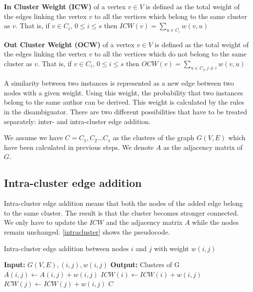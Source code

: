 \begin{mydef}
\textbf{In Cluster Weight (ICW)} of a vertex $v \in V$ is defined as the total weight of the edges linking the vertex $v$ to all the vertices which belong to the same cluster as $v$. That is, if $v \in C_i$, $0 \leq i \leq s$ then $ICW(v) = \sum_{u \in C_i}{w(v,u)}$
\end{mydef}

\begin{mydef}
\textbf{Out Cluster Weight (OCW)} of a vertex $v \in V$ is defined as the total weight of the edges linking the vertex $v$ to all the vertices which do not belong to the same cluster as $v$. That is, if $v \in C_i$, $0 \leq i \leq s$ then $OCW(v) = \sum_{u \in C_j, j \neq i}{w(v,u)}$
\end{mydef}

A similarity between two instances is represented as a new edge between two nodes with a given weight. Using this weight, the probability that two instances belong to the same author can be derived. This weight is calculated by the rules in the disambiguator. There are two different possibilities that have to be treated separately: inter- and intra-cluster edge addition.

We assume we have $C = {C_1,C_2...C_s}$ as the clusters of the graph $G(V,E)$ which have been calculated in previous steps. We denote $A$ as the adjacency matrix of $G$.

\subsection{Intra-cluster edge addition}

Intra-cluster edge addition means that both the nodes of the added edge belong to the same cluster. The result is that the cluster becomes stronger connected. We only have to update the $ICW$ and the adjacency matrix $A$ while the nodes remain unchanged. \autoref{intracluster} shows the pseudocode.

\begin{algorithm}
\caption{Intra-cluster edge addition between nodes $i$ and $j$ with weight $w(i,j)$}
\label{intracluster}
\begin{algorithmic}
\STATE \textbf{Input:} $G(V,E), (i,j), w(i,j)$ 
\STATE \textbf{Output:} Clusters of G
\STATE $A(i,j) \leftarrow A(i,j) + w(i,j)$
\STATE $ICW(i) \leftarrow ICW(i) + w(i,j)$
\STATE $ICW(j) \leftarrow ICW(j) + w(i,j)$
\RETURN $C$
\end{algorithmic}
\end{algorithm}

